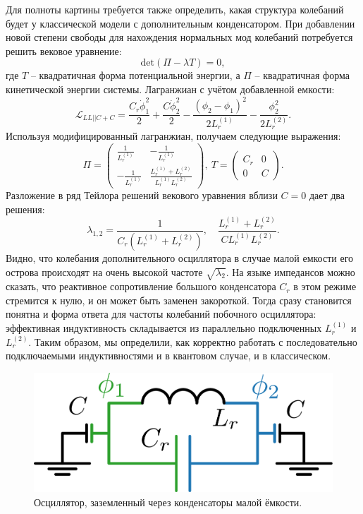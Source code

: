 \documentclass[14pt, a4paper]{extreport}
\numberwithin{equation}{section}
\begin{document}
Для полноты картины требуется также определить, какая структура колебаний будет у классической модели с дополнительным конденсатором. При добавлении новой степени свободы для нахождения нормальных мод колебаний потребуется решить вековое уравнение:
\begin{equation}
	\text{det}(\Pi - \lambda T) = 0,
\end{equation}
где $T$ -- квадратичная форма потенциальной энергии, а $\Pi$ -- квадратичная форма кинетической энергии системы. Лагранжиан с учётом добавленной емкости:
\begin{equation}
\mathcal{L}_{LL||C+C} = \frac{C_r \dot\phi_1^2}{2} + \frac{C \dot\phi_2^2}{2} - \frac{(\phi_2 - \phi_1)^2}{2L_r^{(1)}} - \frac{\phi_2^2}{2 L_r^{(2)}}.
\end{equation}
Используя модифицированный лагранжиан, получаем следующие выражения:
\begin{equation}
	\Pi = \left(
	\begin{matrix}
	\frac{1}{L_r^{(1)}}&-\frac{1}{L_r^{(1)}}\\
	-\frac{1}{L_r^{(1)}}&\frac{L_r^{(1)}+L_r^{(2)}}{L_r^{(1)}L_r^{(2)}}
	\end{matrix}\right),\ 
	T = \left(
	\begin{matrix}
	C_r& 0 \\
	0 & C
	\end{matrix}\right).
\end{equation}
Разложение в ряд Тейлора решений векового уравнения вблизи $C = 0$ дает два решения:
\begin{equation}
	\lambda_{1,2} = \frac{1}{C_r\left(L_r^{(1)}+L_r^{(2)}\right)},\quad \frac{L_r^{(1)}+L_r^{(2)}}{C L_r^{(1)}L_r^{(2)}}.
\end{equation}
Видно, что колебания дополнительного осциллятора в случае малой емкости его острова происходят на очень высокой частоте $\sqrt{\lambda_2}$. На языке импедансов можно сказать, что реактивное сопротивление большого конденсатора $C_r$ в этом режиме стремится к нулю, и он может быть заменен закороткой. Тогда сразу становится понятна и форма ответа для частоты колебаний побочного осциллятора: эффективная индуктивность складывается из параллельно подключенных $L_r^{(1)}$ и $L_r^{(2)}$. Таким образом, мы определили, как корректно работать с последовательно подключаемыми индуктивностями и в квантовом случае, и в классическом.

\begin{figure}
	\centering
	\includegraphics[width=0.5\linewidth]{Pictures/lc_cap_inv}
	\caption{Осциллятор, заземленный через конденсаторы малой ёмкости.}
	\label{fig:lccapinv}
\end{figure}
\end{document}

